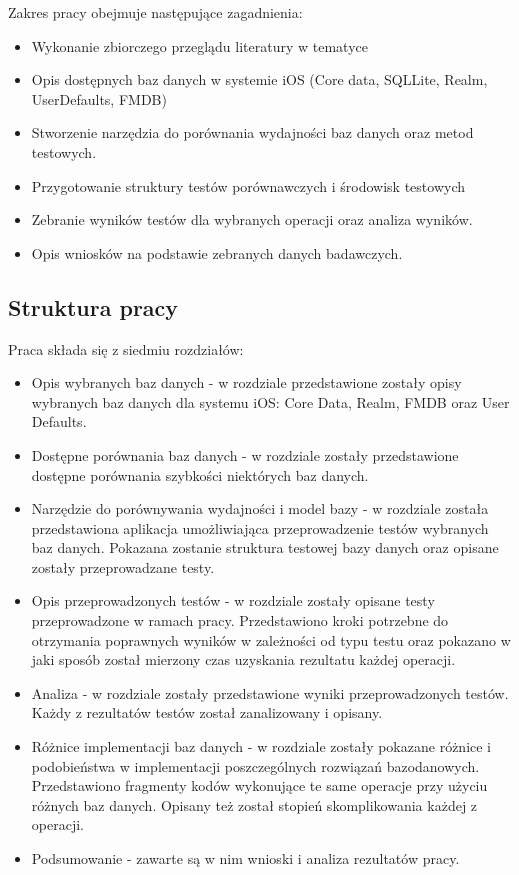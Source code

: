 Zakres pracy obejmuje następujące zagadnienia: 

\begin{itemize}
	\item Wykonanie zbiorczego przeglądu literatury w tematyce
	\item Opis dostępnych baz danych w systemie iOS (Core data, SQLLite, Realm, UserDefaults, FMDB)
	\item Stworzenie narzędzia do porównania wydajności baz danych oraz metod testowych.
	\item Przygotowanie struktury testów porównawczych i środowisk testowych
	\item Zebranie wyników testów dla wybranych operacji oraz analiza wyników.
	\item Opis wniosków na podstawie zebranych danych badawczych.
\end{itemize}

\subsection{Struktura pracy}

Praca składa się z siedmiu rozdziałów:

\begin{itemize}
	\item  Opis wybranych baz danych - w rozdziale przedstawione zostały opisy wybranych baz danych dla systemu iOS: Core Data, Realm, FMDB oraz User Defaults. 
	\item Dostępne porównania baz danych - w rozdziale zostały przedstawione dostępne porównania szybkości niektórych baz danych.
	\item Narzędzie do porównywania wydajności i model bazy - w rozdziale została przedstawiona aplikacja umożliwiająca przeprowadzenie testów wybranych baz danych. Pokazana zostanie struktura testowej bazy danych oraz opisane zostały przeprowadzane testy.
	\item Opis przeprowadzonych testów - w rozdziale zostały opisane testy przeprowadzone w ramach pracy. Przedstawiono kroki potrzebne do otrzymania poprawnych wyników w zależności od typu testu oraz pokazano w jaki sposób został mierzony czas uzyskania rezultatu każdej operacji. 
	\item Analiza - w rozdziale zostały przedstawione wyniki przeprowadzonych testów. Każdy z rezultatów testów został zanalizowany i opisany.
	\item Różnice implementacji baz danych -
w rozdziale zostały pokazane różnice i podobieństwa w implementacji poszczególnych rozwiązań bazodanowych. Przedstawiono fragmenty kodów wykonujące te same operacje przy użyciu różnych baz danych. Opisany też został stopień skomplikowania każdej z operacji.
\item Podsumowanie - zawarte są w nim wnioski i analiza rezultatów pracy.
\end{itemize}

	
	
	
	
	
	
	
	
	
	
	